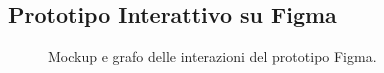 \subsection{Prototipo Interattivo su Figma}

\begin{figure}[H]
    \centering
    \caption{Mockup e grafo delle interazioni del prototipo Figma.}
    \label{fig:figma_mockups}
\end{figure}
